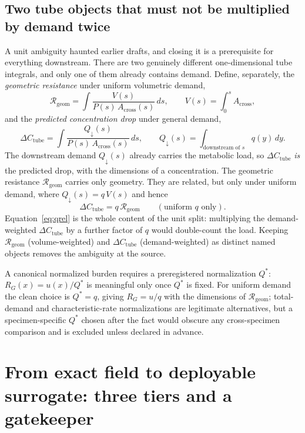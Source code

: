 \documentclass[11pt]{article}
\theoremstyle{remark}
\newcommand{\Acr}{A_{\mathrm{cross}}}
\newcommand{\Rgeom}{\mathcal{R}_{\mathrm{geom}}}
\newcommand{\dCtube}{\Delta C_{\mathrm{tube}}}
\newcommand{\Qdn}{Q_{\downarrow}}
\newcommand{\RG}{R_{G}}
\newcommand{\Qstar}{Q^{\!*}}
\begin{document}
\subsection{Two tube objects that must not be multiplied by demand twice}

A unit ambiguity haunted earlier drafts, and closing it is a prerequisite for
everything downstream. There are two genuinely different one-dimensional tube
integrals, and only one of them already contains demand. Define, separately, the
\emph{geometric resistance} under uniform volumetric demand,
\begin{equation}\label{eq:rgeom}
\Rgeom=\int\frac{V(s)}{P(s)\,\Acr(s)}\,ds,\qquad V(s)=\int_0^s\Acr,
\end{equation}
and the \emph{predicted concentration drop} under general demand,
\begin{equation}\label{eq:dctube}
\dCtube=\int\frac{\Qdn(s)}{P(s)\,\Acr(s)}\,ds,\qquad
\Qdn(s)=\int_{\text{downstream of }s} q(y)\,dy.
\end{equation}
The downstream demand $\Qdn(s)$ already carries the metabolic load, so $\dCtube$
\emph{is} the predicted drop, with the dimensions of a concentration. The
geometric resistance $\Rgeom$ carries only geometry. They are related, but only
under uniform demand, where $\Qdn(s)=q\,V(s)$ and hence
\begin{equation}\label{eq:qrel}
\dCtube=q\,\Rgeom\qquad(\text{uniform }q\text{ only}).
\end{equation}
Equation~\eqref{eq:qrel} is the whole content of the unit split: multiplying the
demand-weighted $\dCtube$ by a further factor of $q$ would double-count the load.
Keeping $\Rgeom$ (volume-weighted) and $\dCtube$ (demand-weighted) as distinct
named objects removes the ambiguity at the source.

A canonical normalized burden requires a preregistered normalization $\Qstar$:
$\RG(x)=u(x)/\Qstar$ is meaningful only once $\Qstar$ is fixed. For uniform demand
the clean choice is $\Qstar=q$, giving $\RG=u/q$ with the dimensions of $\Rgeom$;
total-demand and characteristic-rate normalizations are legitimate alternatives,
but a specimen-specific $\Qstar$ chosen after the fact would obscure any
cross-specimen comparison and is excluded unless declared in advance.

\section{From exact field to deployable surrogate: three tiers and a
gatekeeper}\label{sec:tiers}
\end{document}
